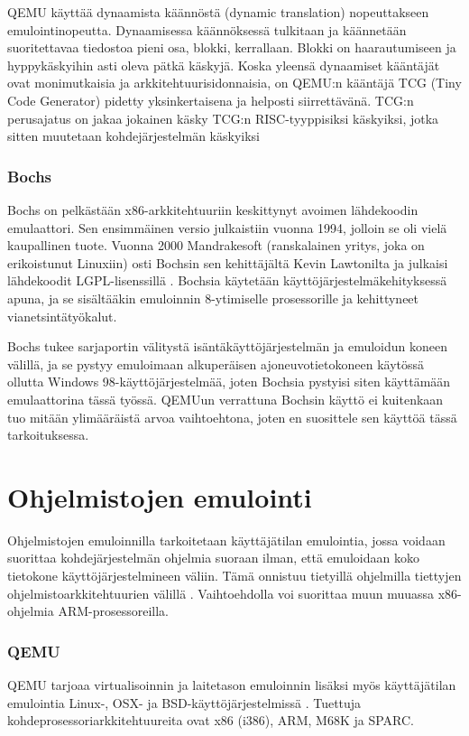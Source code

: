 QEMU käyttää dynaamista käännöstä (dynamic translation) nopeuttakseen emulointinopeutta. Dynaamisessa käännöksessä tulkitaan ja käännetään suoritettavaa tiedostoa pieni osa, blokki, kerrallaan. Blokki on haarautumiseen ja hyppykäskyihin asti oleva pätkä käskyjä. Koska yleensä dynaamiset kääntäjät ovat monimutkaisia ja arkkitehtuurisidonnaisia, on QEMU:n kääntäjä TCG (Tiny Code Generator) pidetty yksinkertaisena ja helposti siirrettävänä. TCG:n perusajatus on jakaa jokainen käsky TCG:n RISC-tyyppisiksi käskyiksi, jotka sitten muutetaan kohdejärjestelmän käskyiksi \citep{qemu_tech}


\subsubsection{Bochs}
Bochs on pelkästään x86-arkkitehtuuriin keskittynyt avoimen lähdekoodin emulaattori. Sen ensimmäinen versio julkaistiin vuonna 1994, jolloin se oli vielä kaupallinen tuote. Vuonna 2000 Mandrakesoft (ranskalainen yritys, joka on erikoistunut Linuxiin) osti Bochsin sen kehittäjältä Kevin Lawtonilta ja julkaisi lähdekoodit LGPL-lisenssillä \citep{bochs0}. Bochsia käytetään käyttöjärjestelmäkehityksessä apuna, ja se sisältääkin emuloinnin 8-ytimiselle prosessorille ja kehittyneet vianetsintätyökalut. \cite{bochs_doc}

Bochs tukee sarjaportin välitystä isäntäkäyttöjärjestelmän ja emuloidun koneen välillä, ja se pystyy emuloimaan alkuperäisen ajoneuvotietokoneen käytössä ollutta Windows 98-käyttöjärjestelmää, joten Bochsia pystyisi siten käyttämään emulaattorina tässä työssä. QEMUun verrattuna Bochsin käyttö ei kuitenkaan tuo mitään ylimääräistä arvoa vaihtoehtona, joten en suosittele sen käyttöä tässä tarkoituksessa.


\section{Ohjelmistojen emulointi}
Ohjelmistojen emuloinnilla tarkoitetaan käyttäjätilan emulointia, jossa voidaan suorittaa kohdejärjestelmän ohjelmia suoraan ilman, että emuloidaan koko tietokone käyttöjärjestelmineen väliin. Tämä onnistuu tietyillä ohjelmilla tiettyjen ohjelmistoarkkitehtuurien välillä \cite{tinycc, qemu_use}. Vaihtoehdolla voi suorittaa muun muuassa x86-ohjelmia ARM-prosessoreilla.

\subsubsection{QEMU}
QEMU tarjoaa virtualisoinnin ja laitetason emuloinnin lisäksi myös käyttäjätilan emulointia Linux-, OSX- ja BSD-käyttöjärjestelmissä \cite{qemu_use}. Tuettuja kohdeprosessoriarkkitehtuureita ovat x86 (i386), ARM, M68K ja SPARC.

